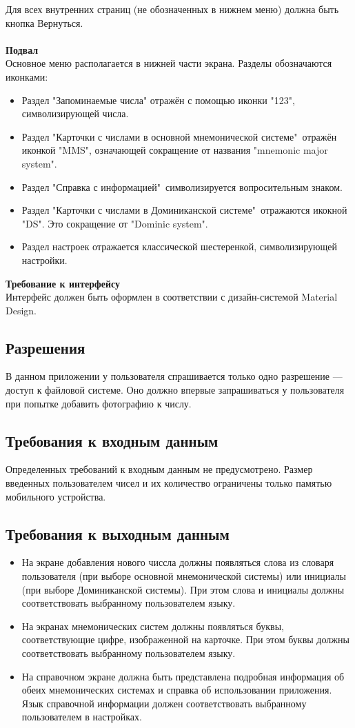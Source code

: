 \documentclass[draft]{article}
\begin{document}
Для всех внутренних страниц (не обозначенных в нижнем меню) должна быть кнопка
Вернуться.\\
~\\
\textbf{Подвал}\\
Основное меню располагается в нижней части экрана. Разделы обозначаются иконками:
\begin{itemize}
\item Раздел "{}Запоминаемые числа"{} отражён с помощью иконки "{}123"{}, символизирующей числа.
\item Раздел "{}Карточки с числами в основной мнемонической системе"{}\ отражён иконкой "{}MMS"{}, означающей сокращение от названия "{}mnemonic major system"{}.
\item Раздел "{}Справка с информацией"{}\ символизируется вопросительным знаком.
\item Раздел "{}Карточки с числами в Доминиканской системе"{}\ отражаются икокной "{}DS"{}. Это сокращение от "{}Dominic system"{}.
\item Раздел настроек отражается классической шестеренкой, символизирующей настройки.
\end{itemize}
\textbf{Требование к интерфейсу}\\
Интерфейс должен быть оформлен в соответствии с дизайн-системой Material Design.
\subsection{Разрешения}
В данном приложении у пользователя спрашивается только одно разрешение — доступ к файловой системе. Оно должно впервые запрашиваться у пользователя при попытке добавить фотографию к числу.
\subsection{Требования к входным данным}
Определенных требований к входным данным не предусмотрено. Размер введенных пользователем чисел и их количество ограничены только памятью мобильного устройства.
\subsection{Требования к выходным данным}
\begin{itemize}
\item На экране добавления нового чиссла должны появляться слова из словаря пользователя (при выборе основной мнемонической системы) или инициалы (при выборе Доминиканской системы). При этом слова и инициалы должны соответствовать выбранному пользователем языку.
\item На экранах мнемонических систем должны появляться буквы, соответствующие цифре, изображенной на карточке. При этом буквы должны соответствовать выбранному пользователем языку.
\item На справочном экране должна быть представлена подробная информация об обеих мнемонических системах и справка об использовании приложения. Язык справочной информации должен соответствовать выбранному пользователем в настройках.
\end{itemize}
\end{document}
